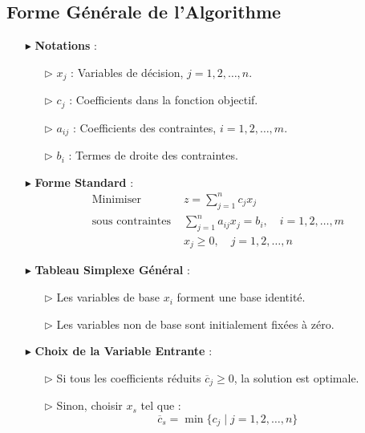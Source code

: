 \documentclass{report}
\begin{document}
\begin{multicols*}{2}
\section{Forme Générale de l'Algorithme}

    \begin{itemize}
        \item[$\blacktriangleright$] \textbf{Notations} :
            \begin{itemize}
                \item[$\rhd$] \( x_j \) : Variables de décision, \( j = 1, 2, \dots, n \).
                \item[$\rhd$] \( c_j \) : Coefficients dans la fonction objectif.
                \item[$\rhd$] \( a_{ij} \) : Coefficients des contraintes, \( i = 1, 2, \dots, m \).
                \item[$\rhd$] \( b_i \) : Termes de droite des contraintes.
            \end{itemize}

        \item[$\blacktriangleright$] \textbf{Forme Standard} :
        \[%
            \begin{aligned}
            \text{Minimiser } & z = \sum_{j=1}^{n} c_j x_j \\
            \text{sous contraintes } & \sum_{j=1}^{n} a_{ij} x_j = b_i, \quad i = 1, 2, \dots, m \\
            & x_j \geq 0, \quad j = 1, 2, \dots, n
            \end{aligned}
        \]%

        \item[$\blacktriangleright$] \textbf{Tableau Simplexe Général} :
            \begin{itemize}
                \item[$\rhd$] Les variables de base \( x_i \) forment une base identité.
                \item[$\rhd$] Les variables non de base sont initialement fixées à zéro.
            \end{itemize}

        \item[$\blacktriangleright$] \textbf{Choix de la Variable Entrante} :
            \begin{itemize}
                \item[$\rhd$] Si tous les coefficients réduits \( \overline{c}_j \geq 0 \), la solution est optimale.
                \item[$\rhd$] Sinon, choisir \( x_s \) tel que :
                \[%
                \boxed{\overline{c}_s = \min \{ c_j \mid j = 1, 2, \dots, n \}}
                \]%
            \end{itemize}


\end{itemize}
\end{multicols*}
\end{document}
